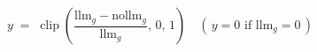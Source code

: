 

\begin{equation*}
y \;=\; \operatorname{clip}\!\left(\frac{\mathrm{llm}_g - \mathrm{nollm}_g}{\mathrm{llm}_g},\,0,\,1\right)\quad(\,y = 0 \text{ if } \mathrm{llm}_g = 0\,)
\tag{3}
\end{equation*}

